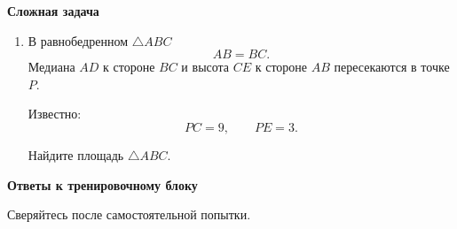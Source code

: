 \documentclass[a4paper,12pt]{article}
\begin{document}
\vspace{2mm}

\textbf{Сложная задача}

\begin{enumerate}[label=\textbf{\arabic*.},resume]

  \item
  В равнобедренном $\triangle ABC$
  \[
  AB=BC.
  \]
  Медиана $AD$ к стороне $BC$ и высота $CE$ к стороне
  $AB$ пересекаются в точке $P$.

  Известно:
  \[
  PC=9,
  \qquad
  PE=3.
  \]

  Найдите площадь $\triangle ABC$.

\end{enumerate}


\newpage

\thispagestyle{fancy}

\begin{center}
{\LARGE\bfseries\color{darkaccent}
Ответы к тренировочному блоку\par}

\vspace{2mm}

{\color{softgray}
Сверяйтесь после самостоятельной попытки.\par}
\end{center}

\vspace{6mm}
\end{document}
